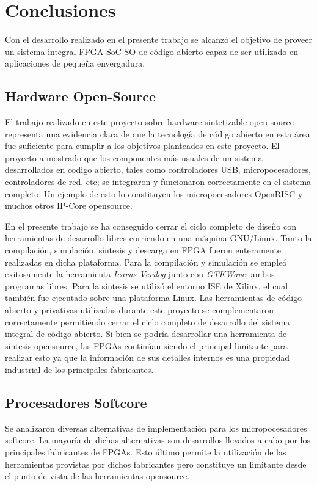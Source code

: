 
\chapter{Conclusiones}
 

Con el desarrollo realizado en el presente trabajo se alcanzó el objetivo de proveer un sistema integral FPGA-SoC-SO de código abierto
capaz de ser utilizado en aplicaciones de pequeña envergadura.

\section{Hardware Open-Source}

El trabajo realizado en este proyecto sobre hardware sintetizable open-source representa una evidencia clara de que la tecnología de
código abierto en esta área fue suficiente para cumplir a los objetivos planteados en este proyecto. El proyecto a mostrado que los componentes
más usuales de un sistema desarrollados en codigo abierto, tales como controladores USB, micropocesadores, controladores de red, etc; se integraron
y funcionaron correctamente en el sistema completo. Un ejemplo de esto lo constituyen los micropocesadores OpenRISC y muchos otros IP-Core
opensource.

En el presente trabajo se ha conseguido cerrar el ciclo completo de diseño con herramientas de desarrollo libres corriendo en una máquina GNU/Linux.
Tanto la compilación, simulación, síntesis y descarga en FPGA fueron enteramente realizadas en dicha plataforma. Para la compilación y
simulación se empleó exitosamente la herramienta \textit{Icarus Verilog} junto con \textit{GTKWave}; ambos programas libres. Para la síntesis se
utilizó el entorno ISE de Xilinx, el cual también fue ejecutado sobre una plataforma Linux. Las herramientas de código abierto y privativas
utilizadas durante este proyecto se complementaron correctamente permitiendo cerrar el ciclo completo de desarrollo del sistema integral de código
abierto. Si bien se podría desarrollar una herramienta de síntesis opensource, las FPGAs continúan siendo el principal limitante para realizar esto ya
que la información de sus detalles internos es una propiedad industrial de los principales fabricantes. 

\section{Procesadores Softcore}

Se analizaron diversas alternativas de implementación para los micropocesadores softcore. La mayoría de dichas alternativas son desarrollos llevados
a cabo por los principales fabricantes de FPGAs. Esto último permite la utilización de las herramientas provistas por dichos fabricantes pero
constituye un limitante desde el punto de vista de las herramientas opensource.


